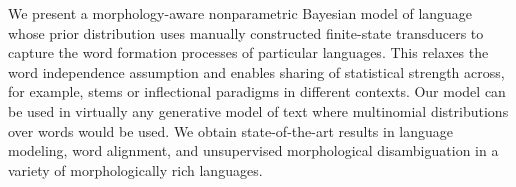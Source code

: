 We present a morphology-aware nonparametric Bayesian model of language whose prior distribution uses manually constructed finite-state transducers to
 capture the word formation processes of particular languages. This relaxes the
 word independence assumption and enables sharing of statistical strength
 across, for example, stems or inflectional paradigms in different contexts. Our
 model can be used in virtually any generative model of text where multinomial
 distributions over words would be used. We obtain state-of-the-art results in
 language modeling, word alignment, and unsupervised morphological
 disambiguation in a variety of morphologically rich languages.

